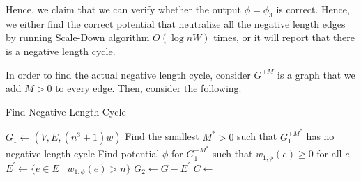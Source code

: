 Hence, we claim that we can verify whether the output \(\phi = \phi _3\) is correct. Hence, we either find the correct potential that neutralize all the negative length edges by running \hyperref[algo:scale-down]{Scale-Down algorithm} \(O(\log nW)\) times, or it will report that there is a negative length cycle.

\begin{remark}
	In order to find the actual negative length cycle, consider \(G^{+M}\) is a graph that we add \(M > 0\) to every edge. Then, consider the following.

	\begin{algorithm}[H]\label{algo:find-negative-cyele}
		\DontPrintSemicolon{}
		\caption{Find Negative Length Cycle}
		\BlankLine

		\(G_1 \gets (V, E, (n^3 + 1)w)\)\;
		Find the smallest \(M^{\ast} > 0\) such that \(G_1^{+M^{\ast} }\) has no negative length cycle\;
		Find potential \(\phi \) for \(G_1^{+M^{\ast} }\) such that \(w_{1, \phi }(e) \geq 0\) for all \(e\)\;
		\(E^{\prime} \gets \{ e \in E \mid w_{1, \phi }(e) > n \} \)\;
		\(G_2 \gets G - E^{\prime} \)\;
		\(C \gets\)\;
		\;
	\end{algorithm}
\end{remark}